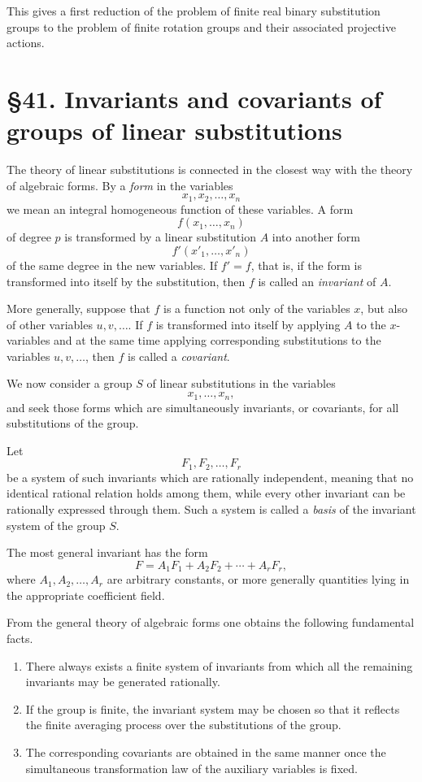 \documentclass[11pt,a4paper]{book}
\newcommand{\webersection}[2]{\clearpage\section*{\S #1. #2}}
\begin{document}
This gives a first reduction of the problem of finite real binary substitution groups to the problem of finite rotation groups and their associated projective actions.

\webersection{41}{Invariants and covariants of groups of linear substitutions}

The theory of linear substitutions is connected in the closest way with the theory of algebraic forms.  By a \emph{form} in the variables
\[
x_1,x_2,\ldots,x_n
\]
we mean an integral homogeneous function of these variables.  A form
\[
f(x_1,\ldots,x_n)
\]
of degree \(p\) is transformed by a linear substitution \(A\) into another form
\[
f'(x'_1,\ldots,x'_n)
\]
of the same degree in the new variables.  If \(f'=f\), that is, if the form is transformed into itself by the substitution, then \(f\) is called an \emph{invariant} of \(A\).

More generally, suppose that \(f\) is a function not only of the variables \(x\), but also of other variables \(u,v,\ldots\).  If \(f\) is transformed into itself by applying \(A\) to the \(x\)-variables and at the same time applying corresponding substitutions to the variables \(u,v,\ldots\), then \(f\) is called a \emph{covariant}.

We now consider a group \(S\) of linear substitutions in the variables
\[
x_1,\ldots,x_n,
\]
and seek those forms which are simultaneously invariants, or covariants, for all substitutions of the group.

Let
\[
F_1,F_2,\ldots,F_r
\]
be a system of such invariants which are rationally independent, meaning that no identical rational relation holds among them, while every other invariant can be rationally expressed through them.  Such a system is called a \emph{basis} of the invariant system of the group \(S\).

The most general invariant has the form
\begin{equation}
F=A_1F_1+A_2F_2+\cdots+A_rF_r,
\end{equation}
where \(A_1,A_2,\ldots,A_r\) are arbitrary constants, or more generally quantities lying in the appropriate coefficient field.

From the general theory of algebraic forms one obtains the following fundamental facts.

\begin{enumerate}[label=\Roman*.]
\item There always exists a finite system of invariants from which all the remaining invariants may be generated rationally.
\item If the group is finite, the invariant system may be chosen so that it reflects the finite averaging process over the substitutions of the group.
\item The corresponding covariants are obtained in the same manner once the simultaneous transformation law of the auxiliary variables is fixed.
\end{enumerate}
\end{document}
